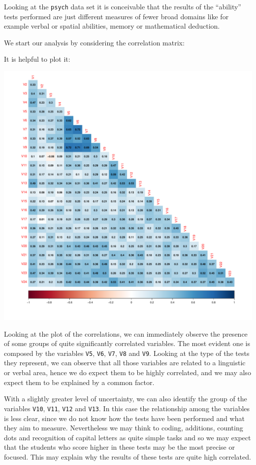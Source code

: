 \documentclass[
  letterpaper,
  DIV=11,
  numbers=noendperiod]{scrartcl}
\begin{document}
Looking at the \texttt{psych} data set it is conceivable that the
results of the ``ability'' tests performed are just different measures
of fewer broad domains like for example verbal or spatial abilities,
memory or mathematical deduction.

We start our analysis by considering the correlation matrix:

It is helpful to plot it:

\includegraphics{ProblemSet2_files/figure-pdf/unnamed-chunk-7-1.pdf}

Looking at the plot of the correlations, we can immediately observe the
presence of some groups of quite significantly correlated variables. The
most evident one is composed by the variables \texttt{V5}, \texttt{V6},
\texttt{V7}, \texttt{V8} and \texttt{V9}. Looking at the type of the
tests they represent, we can observe that all those variables are
related to a linguistic or verbal area, hence we do expect them to be
highly correlated, and we may also expect them to be explained by a
common factor.

With a slightly greater level of uncertainty, we can also identify the
group of the variables \texttt{V10}, \texttt{V11}, \texttt{V12} and
\texttt{V13}. In this case the relationship among the variables is less
clear, since we do not know how the tests have been performed and what
they aim to measure. Nevertheless we may think to coding, additions,
counting dots and recognition of capital letters as quite simple tasks
and so we may expect that the students who score higher in these tests
may be the most precise or focused. This may explain why the results of
these tests are quite high correlated.
\end{document}
